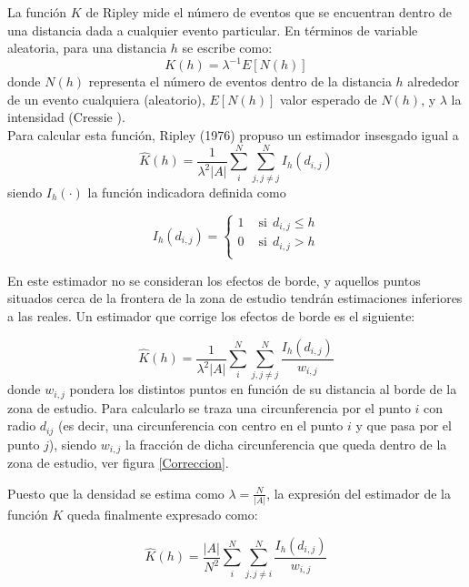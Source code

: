 \documentclass[12pt]{report}
\begin{document}
		
		
		
		
		La función $K$ de Ripley mide el número de eventos que se encuentran dentro de una distancia dada a cualquier evento particular. En términos de variable aleatoria, para una distancia $h$ se escribe como:
		\[ K(h) = \lambda^{-1} E[N(h)] \] 
		donde $N(h)$  representa el número de  eventos dentro de la distancia $h$ alrededor de un evento  cualquiera (aleatorio),    $E[N(h)]$ valor esperado de  $N(h)$, y $\lambda$ la intensidad (Cressie \cite{Cress}).\\
		
		Para calcular esta función, Ripley (1976) propuso un estimador insesgado igual a 
		\[ \widehat{K}(h) = \frac{1}{\lambda^{2} |A|}\sum_{i}^{N}\sum_{j, j\neq j}^{N} I_{h}(d_{i,j} ) \] siendo  $ I_{h}(\cdot) $ 
		la función indicadora definida como
		
		\[ I_{h}(d_{i,j}) =  \left\{ \begin{array}{rcl}
		1 & \text{ si} \:\:  d_{i,j} \leq h \\
		0 &\text{ si} \:\: d_{i,j} >  h\\
		\end{array}
		\right.  \] 
		
		En este estimador no se consideran los efectos de borde, y aquellos puntos situados cerca
		de la frontera de la zona de estudio tendrán estimaciones inferiores a las reales. Un estimador
		que corrige los efectos de borde es el siguiente:
		
		
		\[  \widehat{K}(h) = \frac{1}{\lambda^{2} |A|} \sum_{i}^{N}\sum_{j, j\neq j}^{N}\frac{I_{h}(d_{i,j} )}{w_{i,j}} \] donde $w_{i,j}$  pondera los distintos puntos en función de su distancia al borde de la zona de estudio. Para calcularlo se traza una circunferencia por el punto $i$ con radio $d_{ij}$ (es decir, una circunferencia con centro en el punto $i$ y que pasa por el punto $j$), siendo $w_{i,j}$  la fracción de dicha circunferencia que queda dentro de la zona de estudio, ver figura \ref{Correccion}.
				
		Puesto que la densidad se estima como $\lambda = \frac{N}{|A|}$, la expresión del estimador de la función $K$  queda finalmente expresado como: 
		
		\[  \widehat{K}(h) = \frac{|A|}{N^{2}}\sum_{i}^{N}\sum_{j, j\neq i}^{N}\frac{I_{h}(d_{i,j} )}{w_{i,j}} \]
		
\end{document}

